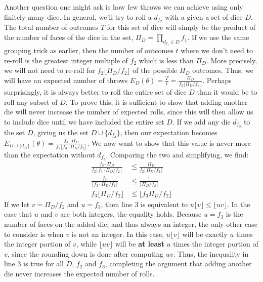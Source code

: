 \documentclass{article}
\begin{document}
\par Another question one might ask is how few throws we can achieve using only finitely many dice.
In general, we'll try to roll a $d_{f_2}$ with a given a set of dice $D$. 
The total number of outcomes $T$ for this set of dice will simply be the product of the number of faces of the dice in the set, $\Pi_D=\prod_{d_{f_1}\in{D}}f_1$.
If we use the same grouping trick as earlier, then the number of outcomes $t$ where we don't need to re-roll is the greatest integer multiple of $f_2$ which is less than $\Pi_D$.
More precisely, we will not need to re-roll for $f_2\lfloor \Pi_D/f_2\rfloor$ of the possible $\Pi_D$ outcomes. 
Thus, we will have an expected number of throws $E_D(\theta) = \frac{T}{t} = \frac{\Pi_D}{f_2\lfloor \Pi_D/f_2\rfloor}$.
Perhaps surprisingly, it is always better to roll the entire set of dice $D$ than it would be to roll any subset of $D$. 
To prove this, it is sufficient to show that adding another die will never increase the number of expected rolls, since this will then allow us to include dice until we have included the entire set $D$.
If we add any die $d_{f_3}$ to the set $D$, giving us the set $D\cup \{d_{f_3}\}$, then our expectation becomes $E_{D\cup\{d_{f_3}\}}(\theta) = \frac{f_3 \cdot \Pi_D}{f_2\lfloor f_3 \cdot \Pi_D/f_2\rfloor}$.
We now want to show that this value is never more than the expectation without $d_{f_3}$. 
Comparing the two and simplifying, we find:
\begin{align}
\frac{f_3 \cdot \Pi_D}{f_2\lfloor f_3 \cdot \Pi_D/f_2\rfloor} & \leq\frac{\Pi_D}{f_2\lfloor \Pi_D/f_2\rfloor}\\
\frac{f_3}{\lfloor f_3 \cdot \Pi_D/f_2\rfloor} &\leq \frac{1}{\lfloor \Pi_D/f_2\rfloor}\\
f_3 \lfloor \Pi_D / f_2 \rfloor &\leq \lfloor f_3 \Pi_D / f_2 \rfloor
\end{align}
If we let $v = \Pi_D / f_2$ and $u = f_3$, then line 3 is equivalent to $u \lfloor v \rfloor \leq \lfloor uv \rfloor$.
In the case that $u$ and $v$ are both integers, the equality holds.
Because $u = f_3$ is the number of faces on the added die, and thus always an integer, the only other case to consider is when $v$ is not an integer.
In this case, $u \lfloor v \rfloor$ will be exactly $u$ times the integer portion of $v$, while $\lfloor uv \rfloor$ will be \textbf{at least} $u$ times the integer portion of $v$, since the rounding down is done after computing $uv$.
Thus, the inequality in line 3 is true for all $D$, $f_2$ and $f_3$, completing the argument that adding another die never increases the expected number of rolls.
\end{document}
